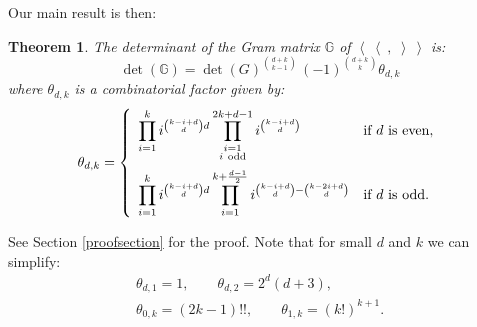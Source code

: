 \documentclass{amsart}
\newcommand{\bra}{\left<\!\!\!\:\left<}
\newcommand{\ket}{\right>\!\!\!\:\right>}
\newcommand{\G}{\mathbb{G}}
\theoremstyle{plain}
\newtheorem{theorem}{Theorem}[section]
\theoremstyle{definition}
\theoremstyle{remark}
\begin{document}
Our main result is then:
\begin{theorem} \label{maintheorem}
The determinant of the Gram matrix $\G$ of $\bra\ ,\;\ket$ is:
\begin{equation}
\det(\G)= \det(G)^{\binom{d+k}{k-1}}\,(-1)^{\binom{d+k}{k}}\theta_{d,k}
\end{equation}
where $\theta_{d,k}$ is a combinatorial factor given by:
\begin{equation}
\theta_{d,k} = \left\{
 \begin{array}{*2{l}p{5cm}}
 \displaystyle\prod_{i=1}^k i^{\binom{k-i+d}{d}d}\prod_{\substack{i=1 \\ i\ \text{odd}\\\ }}^{2k+d-1}i^{\binom{k-i+d}{d}} &\text{if }d\text{ is even}, \\
 \displaystyle\prod_{i=1}^k i^{\binom{k-i+d}{d}d}\prod_{i=1}^{k+\frac{d-1}{2}} i^{\binom{k-i+d}{d} - \binom{k-2i+d}{d}} &\text{if }d\text{ is odd}.
\end{array}
\right.
\end{equation}
\end{theorem}
See Section \ref{proofsection} for the proof. Note that for small $d$ and $k$ we can simplify:
\begin{gather*}
\theta_{d,1} =1,\qquad \theta_{d,2} = 2^{d}(d+3), \\
\theta_{0,k} = (2k-1)!!, \qquad \theta_{1,k} = (k!)^{k+1}.
\end{gather*}
\end{document}
